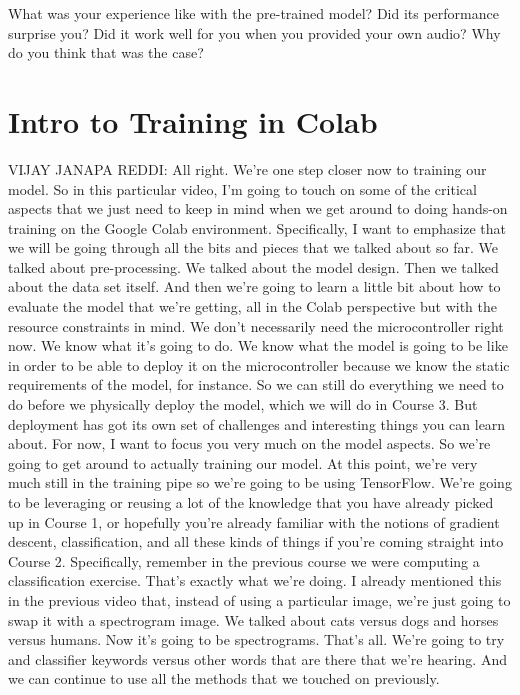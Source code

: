 What was your experience like with the pre-trained model? Did its performance surprise you? Did it work well for you when you provided your own audio? Why do you think that was the case?

\section{Intro to Training in Colab}

VIJAY JANAPA REDDI: All right.
We're one step closer now to training our model.
So in this particular video, I'm going to touch
on some of the critical aspects that we just
need to keep in mind when we get around to doing hands-on training
on the Google Colab environment.
Specifically, I want to emphasize that we will be going through all the bits
and pieces that we talked about so far.
We talked about pre-processing.
We talked about the model design.
Then we talked about the data set itself.
And then we're going to learn a little bit
about how to evaluate the model that we're
getting, all in the Colab perspective but with the resource constraints
in mind.
We don't necessarily need the microcontroller right now.
We know what it's going to do.
We know what the model is going to be like in order
to be able to deploy it on the microcontroller
because we know the static requirements of the model, for instance.
So we can still do everything we need to do before we physically deploy
the model, which we will do in Course 3.
But deployment has got its own set of challenges and interesting things
you can learn about.
For now, I want to focus you very much on the model aspects.
So we're going to get around to actually training our model.
At this point, we're very much still in the training pipe
so we're going to be using TensorFlow.
We're going to be leveraging or reusing a lot of the knowledge
that you have already picked up in Course 1,
or hopefully you're already familiar with the notions of gradient descent,
classification, and all these kinds of things
if you're coming straight into Course 2.
Specifically, remember in the previous course
we were computing a classification exercise.
That's exactly what we're doing.
I already mentioned this in the previous video
that, instead of using a particular image,
we're just going to swap it with a spectrogram image.
We talked about cats versus dogs and horses versus humans.
Now it's going to be spectrograms.
That's all.
We're going to try and classifier keywords versus other words
that are there that we're hearing.
And we can continue to use all the methods that we touched on previously.
